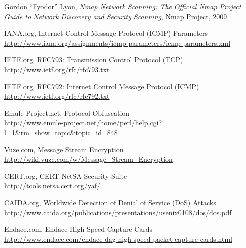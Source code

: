 \documentclass[a4paper]{scrartcl}
\begin{document}


\newpage
\begin{thebibliography}{9}

	 Gordon ``Fyodor'' Lyon, \emph{Nmap Network Scanning: The Official Nmap Project Guide to Network Discovery and Security Scanning},
	Nmap Project,
	2009
	
	 IANA.org, Internet Control Message Protocol (ICMP) Parameters \\
	\url{http://www.iana.org/assignments/icmp-parameters/icmp-parameters.xml}
	
	 IETF.org, RFC793: Transmission Control Protocol (TCP) \\
	\url{http://www.ietf.org/rfc/rfc793.txt}
	
	 IETF.org, RFC792: Internet Control Message Protocol (ICMP) \\
	\url{http://www.ietf.org/rfc/rfc792.txt}
	
	 Emule-Project.net, Protocol Obfuscation \\
	\url{http://www.emule-project.net/home/perl/help.cgi?l=1&rm=show_topic&topic_id=848}
	
	 Vuze.com, Message Stream Encryption \\
	\url{http://wiki.vuze.com/w/Message_Stream_Encryption}
	
	 CERT.org, CERT NetSA Security Suite \\
	\url{http://tools.netsa.cert.org/yaf/}
	
	 CAIDA.org, Worldwide Detection of Denial of Service (DoS) Attacks \\
	\url{http://www.caida.org/publications/presentations/usenix0108/dos/dos.pdf}
	
	 Endace.com, Endace High Speed Capture Cards \\
	\url{http://www.endace.com/endace-dag-high-speed-packet-capture-cards.html}
	
\end{thebibliography}
\end{document}
